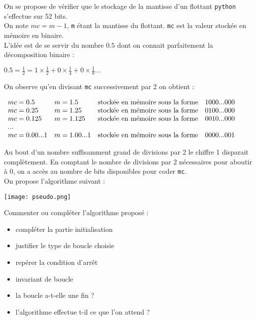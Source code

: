 
On se propose de vérifier que le stockage de la mantisse d'un flottant \texttt{python} s'effectue sur 52 bits.\\

On note $mc=m-1$, \texttt{m} étant la mantisse du flottant.
\texttt{mc} est la valeur stockée en mémoire en binaire.\\

L'idée est de se servir du nombre $0.5$ dont on connait parfaitement la décomposition binaire :

\begin{center}
$0.5=\frac{1}{2}=1 \times \frac{1}{2} + 0 \times \frac{1}{4} + 0 \times \frac{1}{8}... $
\end{center}

On observe qu'en divisant \texttt{mc} successivement par 2 on obtient :
\begin{center}
$
\begin{array}{l l l l}
mc=0.5 & m=1.5 & \mbox{stockée en mémoire sous la forme} & 1000...000\\
mc=0.25 & m=1.25 & \mbox{stockée en mémoire sous la forme} & 0100...000\\
mc=0.125 & m=1.125 & \mbox{stockée en mémoire sous la forme} & 0010...000\\
...\\
mc=0.00...1 & m=1.00...1 & \mbox{stockée en mémoire sous la forme} & 0000...001\\
\end{array}
$
\end{center}

Au bout d'un nombre suffisamment grand de divisions par 2 le chiffre 1 disparait complètement. En comptant le nombre de divisions par 2 nécessaires pour aboutir à 0, on a accès au nombre de bits disponibles pour coder \texttt{mc}.\\
On propose l'algorithme suivant :

\texttt{[image: pseudo.png]}

\begin{qexo}
Commenter ou compléter l'algorithme proposé :
\begin{itemize}
\item compléter la partie initialisation
\item justifier le type de boucle choisie
\item repérer la condition d'arrêt
\item invariant de boucle
\item la boucle a-t-elle une fin ?
\item l'algorithme effectue t-il ce que l'on attend ?
\end{itemize}
\end{qexo}


